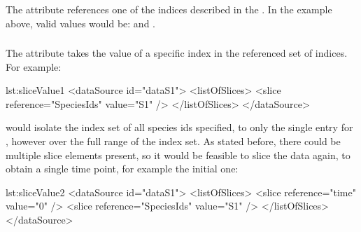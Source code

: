 \subsubsection{}
\label{sec:sliceReference}
The  attribute references one of the indices described in the \hyperref[sec:dimensionDescription]{}. In the example above, valid values would be:  and .

\subsubsection{}
\label{sec:sliceValue}
The  attribute takes the value of a specific index in the referenced set of indices. For example:

\begin{myXmlLst}{}{lst:sliceValue1}
<dataSource id="dataS1">
	<listOfSlices>
		<slice reference="SpeciesIds" value="S1" />
	</listOfSlices>
</dataSource>
\end{myXmlLst} 

would isolate the index set of all species ids specified, to only the single entry for , however over the full range of the  index set. As stated before, there could be multiple slice elements present, so it would be feasible to slice the data again, to obtain a single time point, for example the initial one:

\begin{myXmlLst}{}{lst:sliceValue2}
<dataSource id="dataS1">
	<listOfSlices>
		<slice reference="time" value="0" />
		<slice reference="SpeciesIds" value="S1" />
	</listOfSlices>
</dataSource>
\end{myXmlLst} 
